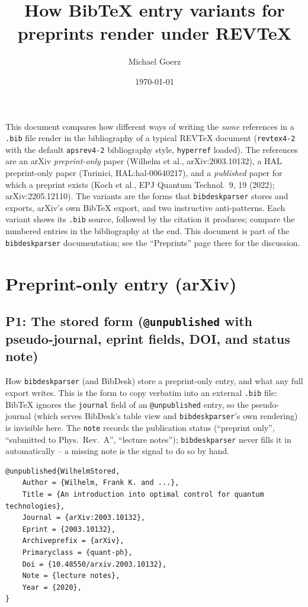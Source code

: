 \documentclass[onecolumn, amsmath, amssymb, aps, pra]{revtex4-2}
\begin{document}
\title{How BibTeX entry variants for preprints render under REVTeX}
\date{\today}
\author{Michael Goerz}
\maketitle

This document compares how different ways of writing the \emph{same}
references in a \texttt{.bib} file render in the bibliography of a typical
REVTeX document (\texttt{revtex4-2} with the default \texttt{apsrev4-2}
bibliography style, \texttt{hyperref} loaded). The references are an arXiv
\emph{preprint-only} paper (Wilhelm et al., arXiv:2003.10132), a HAL
preprint-only paper (Turinici, HAL:hal-00640217), and a \emph{published}
paper for which a preprint exists (Koch et al., EPJ Quantum Technol.\ 9, 19
(2022); arXiv:2205.12110). The variants are the forms that
\texttt{bibdeskparser} stores and exports, arXiv's own BibTeX export, and
two instructive anti-patterns. Each variant shows its \texttt{.bib} source,
followed by the citation it produces; compare the numbered entries in the
bibliography at the end. This document is part of the
\texttt{bibdeskparser} documentation; see the ``Preprints'' page there for
the discussion.

\section{Preprint-only entry (arXiv)}

\subsection{P1: The stored form (\texttt{@unpublished} with
pseudo-journal, eprint fields, DOI, and status
note)~\cite{WilhelmStored}}

How \texttt{bibdeskparser} (and BibDesk) store a preprint-only entry, and
what any full export writes. This is the form to copy verbatim into an
external \texttt{.bib} file: BibTeX ignores the \texttt{journal} field of
an \texttt{@unpublished} entry, so the pseudo-journal (which serves
BibDesk's table view and \texttt{bibdeskparser}'s own rendering) is
invisible here. The \texttt{note} records the publication status
(``preprint only'', ``submitted to Phys.\ Rev.\ A'', ``lecture notes'');
\texttt{bibdeskparser} never fills it in automatically -- a missing note is
the signal to do so by hand.

\begin{Verbatim}
@unpublished{WilhelmStored,
    Author = {Wilhelm, Frank K. and ...},
    Title = {An introduction into optimal control for quantum technologies},
    Journal = {arXiv:2003.10132},
    Eprint = {2003.10132},
    Archiveprefix = {arXiv},
    Primaryclass = {quant-ph},
    Doi = {10.48550/arxiv.2003.10132},
    Note = {lecture notes},
    Year = {2020},
}
\end{Verbatim}
\end{document}
